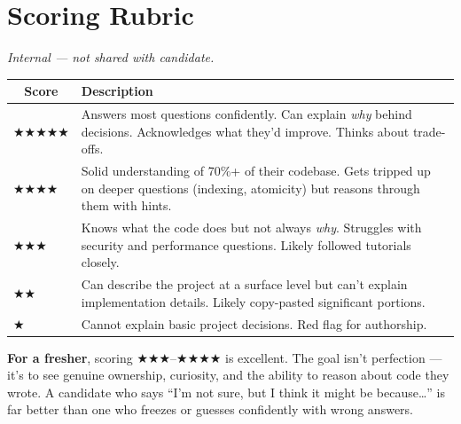 \documentclass[12pt, a4paper]{article}
\begin{document}
\newpage

\section*{Scoring Rubric}

{\small\textcolor{slatelight}{\emph{Internal — not shared with candidate.}}}

\vspace{0.5cm}

\renewcommand{\arraystretch}{1.6}
\begin{tabularx}{\textwidth}{c X}
  \toprule
  \textbf{Score} & \textbf{Description} \\
  \midrule
  $\bigstar\bigstar\bigstar\bigstar\bigstar$
    & Answers most questions confidently. Can explain \emph{why} behind decisions.
      Acknowledges what they'd improve. Thinks about trade-offs. \\
  $\bigstar\bigstar\bigstar\bigstar\phantom{\bigstar}$
    & Solid understanding of 70\%+ of their codebase. Gets tripped up on deeper
      questions (indexing, atomicity) but reasons through them with hints. \\
  $\bigstar\bigstar\bigstar\phantom{\bigstar\bigstar}$
    & Knows what the code does but not always \emph{why}. Struggles with security
      and performance questions. Likely followed tutorials closely. \\
  $\bigstar\bigstar\phantom{\bigstar\bigstar\bigstar}$
    & Can describe the project at a surface level but can't explain implementation
      details. Likely copy-pasted significant portions. \\
  $\bigstar\phantom{\bigstar\bigstar\bigstar\bigstar}$
    & Cannot explain basic project decisions. Red flag for authorship. \\
  \bottomrule
\end{tabularx}

\vspace{1cm}

\begin{tipbox}
\textbf{For a fresher}, scoring $\bigstar\bigstar\bigstar$--$\bigstar\bigstar\bigstar\bigstar$ is excellent. The goal isn't perfection — it's to see genuine ownership, curiosity, and the ability to reason about code they wrote. A candidate who says ``I'm not sure, but I think it might be because\ldots'' is far better than one who freezes or guesses confidently with wrong answers.
\end{tipbox}
\end{document}
